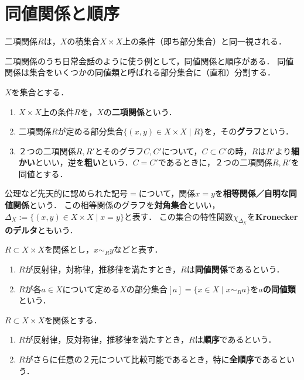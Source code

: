 \documentclass[uplatex,dvipdfmx]{jsreport}
\begin{document}
\section{同値関係と順序}

\begin{screen}
    二項関係$R$は，$X$の積集合$X\times X$上の条件（即ち部分集合）と同一視される．

    二項関係のうち日常会話のように使う例として，同値関係と順序がある．
    同値関係は集合をいくつかの同値類と呼ばれる部分集合に（直和）分割する．
\end{screen}

\begin{definition}
    $X$を集合とする．
    \begin{enumerate}
        \item $X\times X$上の条件$R$を，$X$の\textbf{二項関係}という．
        \item 二項関係$R$が定める部分集合$\{(x,y)\in X\times X\mid R\}$を，その\textbf{グラフ}という．
        \item ２つの二項関係$R,R'$とそのグラフ$C,C'$について，$C\subset C'$の時，$R$は$R'$より\textbf{細かい}といい，逆を\textbf{粗い}という．$C=C'$であるときに，２つの二項関係$R,R'$を同値とする．
    \end{enumerate}
\end{definition}

\begin{example}
    公理など先天的に認められた記号$=$について，関係$x=y$を\textbf{相等関係／自明な同値関係}という．
    この相等関係のグラフを\textbf{対角集合}といい，$\Delta_X:=\{(x,y)\in X\times X\mid x=y\}$と表す．
    この集合の特性関数$\chi_{\Delta_X}$を\textbf{Kroneckerのデルタ}ともいう．
\end{example}

\begin{definition}
    $R\subset X\times X$を関係とし，$x\sim_R y$などと表す．
    \begin{enumerate}
        \item $R$が反射律，対称律，推移律を満たすとき，$R$は\textbf{同値関係}であるという．
        \item $R$が各$a\in X$について定める$X$の部分集合$[a]=\{x\in X\mid x\sim_Ra\}$を\textbf{$a$の同値類}という．
    \end{enumerate}
\end{definition}

\begin{definition}[order]
    $R\subset X\times X$を関係とする．
    \begin{enumerate}
        \item $R$が反射律，反対称律，推移律を満たすとき，$R$は\textbf{順序}であるという．
        \item $R$がさらに任意の２元について比較可能であるとき，特に\textbf{全順序}であるという．
    \end{enumerate}
\end{definition}
\end{document}
